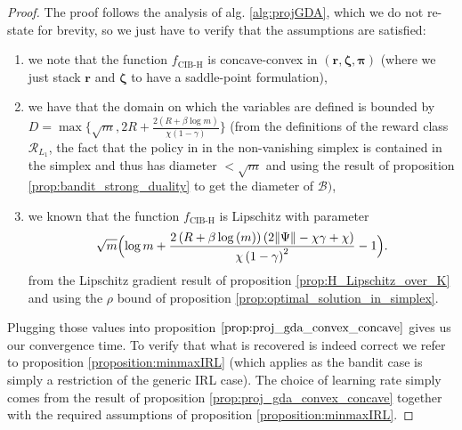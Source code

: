   \begin{proof}
    The proof follows the analysis of alg. \ref{alg:projGDA}, which we do not re-state for brevity, so we just have to verify that the assumptions are satisfied:
    \begin{enumerate}
        \item we note that the function $f_\text{CIB-H}$ is concave-convex in $(\bm{r},\bm{\zeta},\bm{\pi})$ (where we just stack $\bm{r}$ and $\bm{\zeta}$ to have a saddle-point formulation),
        \item we have that the domain on which the variables are defined is bounded by $D= \max\Big\{\sqrt{m},2R +\frac{2(R +\beta \log m)}{\chi (1-\gamma)} \Big\} $ (from the definitions of the reward class $\mathcal{R}_{L_1}$, the fact that the policy in in the non-vanishing simplex is contained in the simplex and thus has diameter $<\sqrt{m}$ and using the result of proposition \ref{prop:bandit_strong_duality} to get the diameter of $\mathcal{B})$,
        \item we known that the function $f_\text{CIB-H}$ is Lipschitz with parameter \[
            \sqrt{m} 
            \Bigl( \log m +
            \frac{2\left(R + \beta \log{\left(m \right)}\right) \left(2  \|\Psi\| - \chi \gamma + \chi\right)}{\chi \left(1- \gamma\right)^{2}} 
            -1
            \Bigr).    
        \] from the Lipschitz gradient result of proposition \ref{prop:H_Lipschitz_over_K} and using the $\rho$ bound of proposition \ref{prop:optimal_solution_in_simplex}.
    \end{enumerate}
    Plugging those values into proposition $\ref{prop:proj_gda_convex_concave}$ gives us our convergence time. To verify that what is recovered is indeed correct we refer to proposition \ref{proposition:minmaxIRL} (which applies as the bandit case is simply a restriction of the generic IRL case). The choice of learning rate simply comes from the result of proposition \ref{prop:proj_gda_convex_concave} together with the required assumptions of proposition \ref{proposition:minmaxIRL}.
\end{proof}

